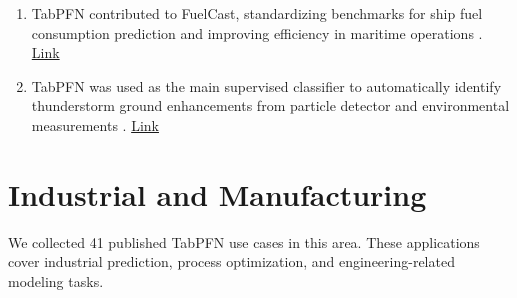 \begin{enumerate}
\item TabPFN contributed to FuelCast, standardizing benchmarks for ship fuel consumption prediction and improving efficiency in maritime operations \cite{energy_usecase14_fuelcast}. \href{https://arxiv.org/abs/2510.08217}{Link}

\item TabPFN was used as the main supervised classifier to automatically identify thunderstorm ground enhancements from particle detector and environmental measurements \cite{energy_usecase15_tge_tabpfn}. \href{https://arxiv.org/abs/2510.25125}{Link}
\end{enumerate}

\section*{Industrial and Manufacturing}

We collected 41 published TabPFN use cases in this area. These applications cover industrial prediction, process optimization, and engineering-related modeling tasks.

